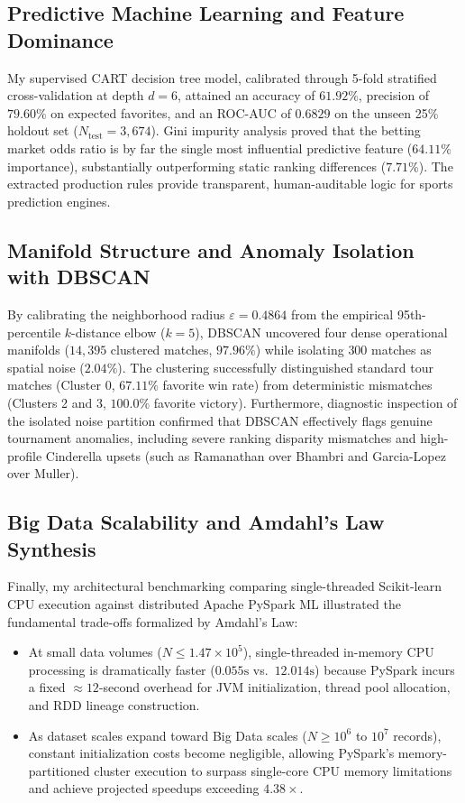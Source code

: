 \documentclass[10pt,journal]{IEEEtran}
\begin{document}
\subsection{Predictive Machine Learning and Feature Dominance}
My supervised CART decision tree model, calibrated through 5-fold stratified cross-validation at depth $d=6$, attained an accuracy of $61.92\%$, precision of $79.60\%$ on expected favorites, and an ROC-AUC of $0.6829$ on the unseen 25\% holdout set ($N_{\text{test}} = 3{,}674$). Gini impurity analysis proved that the betting market odds ratio is by far the single most influential predictive feature ($64.11\%$ importance), substantially outperforming static ranking differences ($7.71\%$). The extracted production rules provide transparent, human-auditable logic for sports prediction engines.

\subsection{Manifold Structure and Anomaly Isolation with DBSCAN}
By calibrating the neighborhood radius $\varepsilon = 0.4864$ from the empirical 95th-percentile $k$-distance elbow ($k=5$), DBSCAN uncovered four dense operational manifolds ($14,395$ clustered matches, $97.96\%$) while isolating $300$ matches as spatial noise ($2.04\%$). The clustering successfully distinguished standard tour matches (Cluster 0, $67.11\%$ favorite win rate) from deterministic mismatches (Clusters 2 and 3, $100.0\%$ favorite victory). Furthermore, diagnostic inspection of the isolated noise partition confirmed that DBSCAN effectively flags genuine tournament anomalies, including severe ranking disparity mismatches and high-profile Cinderella upsets (such as Ramanathan over Bhambri and Garcia-Lopez over Muller).

\subsection{Big Data Scalability and Amdahl's Law Synthesis}
Finally, my architectural benchmarking comparing single-threaded Scikit-learn CPU execution against distributed Apache PySpark ML illustrated the fundamental trade-offs formalized by Amdahl's Law:
\begin{itemize}
    \item At small data volumes ($N \le 1.47 \times 10^5$), single-threaded in-memory CPU processing is dramatically faster ($0.055\text{s}$ vs.\ $12.014\text{s}$) because PySpark incurs a fixed $\approx 12$-second overhead for JVM initialization, thread pool allocation, and RDD lineage construction.
    \item As dataset scales expand toward Big Data scales ($N \ge 10^6$ to $10^7$ records), constant initialization costs become negligible, allowing PySpark's memory-partitioned cluster execution to surpass single-core CPU memory limitations and achieve projected speedups exceeding $4.38\times$.
\end{itemize}
\end{document}
